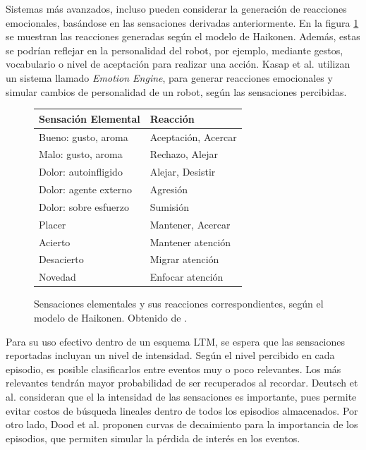 Sistemas más avanzados, incluso pueden considerar la generación de reacciones emocionales, basándose en las sensaciones derivadas anteriormente. En la figura \ref{img:emotional_haikonen} se muestran las reacciones generadas según el modelo de Haikonen. Además, estas se podrían reflejar en la personalidad del robot, por ejemplo, mediante gestos, vocabulario o nivel de aceptación para realizar una acción. Kasap et al. \cite{Kasap2010} utilizan un sistema llamado \textit{Emotion Engine}, para generar reacciones emocionales y simular cambios de personalidad de un robot, según las sensaciones percibidas.

\begin{figure}[H]
\centering
\begin{tabular}{| l | l |}
\hline
\rowcolor{gray!50}
Sensación Elemental & Reacción  \\ 
\hline Bueno: gusto, aroma & Aceptación, Acercar \\ 
\hline Malo: gusto, aroma & Rechazo, Alejar \\ 
\hline Dolor: autoinfligido  & Alejar, Desistir \\ 
\hline Dolor: agente externo & Agresión \\ 
\hline Dolor: sobre esfuerzo & Sumisión \\ 
\hline Placer & Mantener, Acercar \\ 
\hline Acierto & Mantener atención \\ 
\hline Desacierto & Migrar atención \\ 
\hline Novedad & Enfocar atención \\ 
\hline 
\end{tabular} 
\caption{\small Sensaciones elementales y sus reacciones correspondientes, según el modelo de Haikonen. Obtenido de \cite{Dodd2005}.}
\label{img:emotional_haikonen}
\end{figure}


Para su uso efectivo dentro de un esquema LTM, se espera que las sensaciones reportadas incluyan un nivel de intensidad. Según el nivel percibido en cada episodio, es posible clasificarlos entre eventos muy o poco relevantes. Los más relevantes tendrán mayor probabilidad de ser recuperados al recordar. Deutsch et al.  \cite{Deutsch2008} consideran que el la intensidad de las sensaciones es importante, pues permite evitar costos de búsqueda lineales dentro de todos los episodios almacenados. Por otro lado, Dood et al. proponen curvas de decaimiento para la importancia de los episodios, que permiten simular la pérdida de interés en los eventos.


